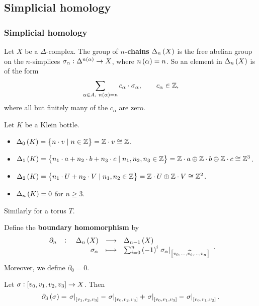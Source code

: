 \pagebreak

\subsection{Simplicial homology}

\subsubsection{Simplicial homology}

Let $ X $ be a $ \Delta $-complex. The group of \textbf{$ n $-chains} $ \Delta_n\br{X} $ is the free abelian group on the $ n $-simplices $ \sigma_\alpha : \Delta^{n\br{\alpha}} \to X $, where $ n\br{\alpha} = n $. So an element in $ \Delta_n\br{X} $ is of the form
$$ \sum_{\alpha \in A, \ n\br{\alpha} = n} c_\alpha \cdot \sigma_\alpha, \qquad c_\alpha \in \Z, $$
where all but finitely many of the $ c_\alpha $ are zero.

\begin{example*}
Let $ K $ be a Klein bottle.
\begin{itemize}
\item $ \Delta_0\br{K} = \cbr{n \cdot v \mid n \in \Z} = \Z \cdot v \cong \Z $.
\item $ \Delta_1\br{K} = \cbr{n_1 \cdot a + n_2 \cdot b + n_3 \cdot c \mid n_1, n_2, n_3 \in \Z} = \Z \cdot a \oplus \Z \cdot b \oplus \Z \cdot c \cong \Z^3 $.
\item $ \Delta_2\br{K} = \cbr{n_1 \cdot U + n_2 \cdot V \mid n_1, n_2 \in \Z} = \Z \cdot U \oplus \Z \cdot V \cong \Z^2 $.
\item $ \Delta_n\br{K} = 0 $ for $ n \ge 3 $.
\end{itemize}
Similarly for a torus $ T $.
\end{example*}


Define the \textbf{boundary homomorphism} by
$$ \function[\partial_n]{\Delta_n\br{X}}{\Delta_{n - 1}\br{X}}{\sigma_\alpha}{\sum_{i = 0}^n \br{-1}^i\eval{\sigma_\alpha}_{\sbr{v_0, \dots, \widehat{v_i}, \dots, v_n}}}. $$
Moreover, we define $ \partial_0 = 0 $.

\begin{example*}
Let $ \sigma : \sbr{v_0, v_1, v_2, v_3} \to X $. Then
$$ \partial_3\br{\sigma} = \eval{\sigma}_{\sbr{v_1, v_2, v_3}} - \eval{\sigma}_{\sbr{v_0, v_2, v_3}} + \eval{\sigma}_{\sbr{v_0, v_1, v_3}} - \eval{\sigma}_{\sbr{v_0, v_1, v_2}}. $$
\end{example*}

